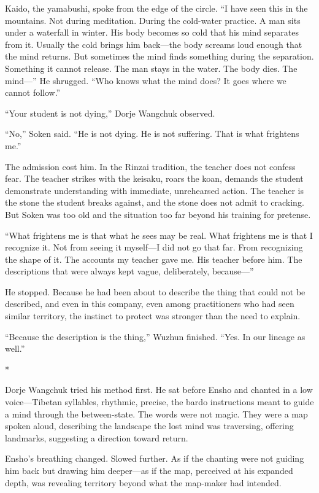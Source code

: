 Kaido, the yamabushi, spoke from the edge of the circle. ``I have seen this in the mountains. Not during meditation. During the cold-water practice. A man sits under a waterfall in winter. His body becomes so cold that his mind separates from it. Usually the cold brings him back---the body screams loud enough that the mind returns. But sometimes the mind finds something during the separation. Something it cannot release. The man stays in the water. The body dies. The mind---'' He shrugged. ``Who knows what the mind does? It goes where we cannot follow.''

``Your student is not dying,'' Dorje Wangchuk observed.

``No,'' Soken said. ``He is not dying. He is not suffering. That is what frightens me.''

The admission cost him. In the Rinzai tradition, the teacher does not confess fear. The teacher strikes with the keisaku, roars the koan, demands the student demonstrate understanding with immediate, unrehearsed action. The teacher is the stone the student breaks against, and the stone does not admit to cracking. But Soken was too old and the situation too far beyond his training for pretense.

``What frightens me is that what he sees may be real. What frightens me is that I recognize it. Not from seeing it myself---I did not go that far. From recognizing the shape of it. The accounts my teacher gave me. His teacher before him. The descriptions that were always kept vague, deliberately, because---''

He stopped. Because he had been about to describe the thing that could not be described, and even in this company, even among practitioners who had seen similar territory, the instinct to protect was stronger than the need to explain.

``Because the description is the thing,'' Wuzhun finished. ``Yes. In our lineage as well.''

\begin{center}
*\quad*\quad*
\end{center}

Dorje Wangchuk tried his method first. He sat before Ensho and chanted in a low voice---Tibetan syllables, rhythmic, precise, the bardo instructions meant to guide a mind through the between-state. The words were not magic. They were a map spoken aloud, describing the landscape the lost mind was traversing, offering landmarks, suggesting a direction toward return.

Ensho's breathing changed. Slowed further. As if the chanting were not guiding him back but drawing him deeper---as if the map, perceived at his expanded depth, was revealing territory beyond what the map-maker had intended.

